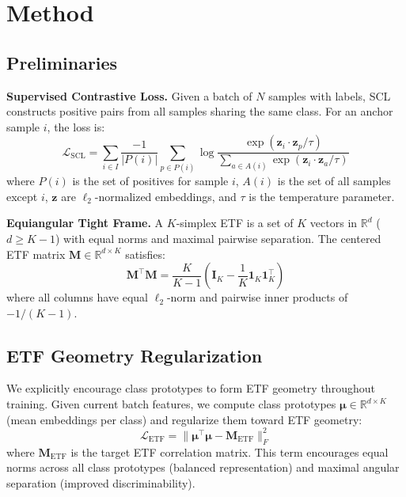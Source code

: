 \documentclass{article}
\begin{document}
\section{Method}

\subsection{Preliminaries}

\textbf{Supervised Contrastive Loss.} Given a batch of $N$ samples with labels, SCL constructs positive pairs from all samples sharing the same class. For an anchor sample $i$, the loss is:
\begin{equation}
\mathcal{L}_{\text{SCL}} = \sum_{i \in I} \frac{-1}{|P(i)|} \sum_{p \in P(i)} \log \frac{\exp(\mathbf{z}_i \cdot \mathbf{z}_p / \tau)}{\sum_{a \in A(i)} \exp(\mathbf{z}_i \cdot \mathbf{z}_a / \tau)}
\end{equation}
where $P(i)$ is the set of positives for sample $i$, $A(i)$ is the set of all samples except $i$, $\mathbf{z}$ are $\ell_2$-normalized embeddings, and $\tau$ is the temperature parameter.

\textbf{Equiangular Tight Frame.} A $K$-simplex ETF is a set of $K$ vectors in $\mathbb{R}^d$ ($d \geq K-1$) with equal norms and maximal pairwise separation. The centered ETF matrix $\mathbf{M} \in \mathbb{R}^{d \times K}$ satisfies:
\begin{equation}
\mathbf{M}^\top \mathbf{M} = \frac{K}{K-1} \left( \mathbf{I}_K - \frac{1}{K} \mathbf{1}_K \mathbf{1}_K^\top \right)
\end{equation}
where all columns have equal $\ell_2$-norm and pairwise inner products of $-1/(K-1)$.

\subsection{ETF Geometry Regularization}

We explicitly encourage class prototypes to form ETF geometry throughout training. Given current batch features, we compute class prototypes $\boldsymbol{\mu} \in \mathbb{R}^{d \times K}$ (mean embeddings per class) and regularize them toward ETF geometry:
\begin{equation}
\mathcal{L}_{\text{ETF}} = \| \boldsymbol{\mu}^\top \boldsymbol{\mu} - \mathbf{M}_{\text{ETF}} \|_F^2
\end{equation}
where $\mathbf{M}_{\text{ETF}}$ is the target ETF correlation matrix. This term encourages equal norms across all class prototypes (balanced representation) and maximal angular separation (improved discriminability).
\end{document}
